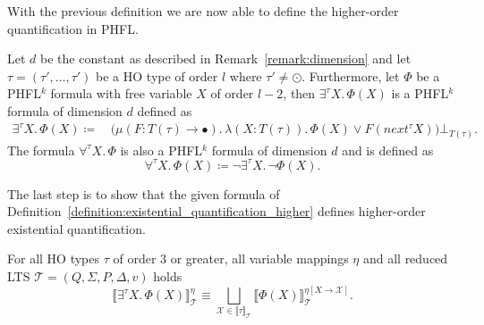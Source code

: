 With the previous definition we are now able to define the higher-order quantification in PHFL.

\begin{definition}
    \label{definition:existential_quantification_higher}
    Let $d$ be the constant as described in Remark~\ref{remark:dimension} and let $\tau = (\tau', \dots, \tau')$ be a HO type of order $l$ where $\tau' \neq \odot$. Furthermore, let
    $\Phi$ be a PHFL$^k$ formula with free variable $X$ of order $l - 2$, then $\exists^{\tau}X .\,\Phi(X)$
    is a PHFL$^k$ formula of dimension $d$ defined as
    \begin{align*}
        \exists^{\tau}X.\, \Phi(X) \coloneqq &\,\big(\mu (F \colon T(\tau) \rightarrow \bullet).\, \lambda (X \colon T(\tau)
        ).\,
        \Phi(X)
        \vee F(next^\tau X)\big)\bot_{T(\tau)}.
    \end{align*}
    The formula $\forall^{\tau}X.\,\Phi$ is also a PHFL$^k$ formula of dimension $d$ and is defined as
    \[\forall^{\tau}X.\,\Phi(X) \coloneqq \neg \exists^{\tau}X .\,\neg\Phi(X).\]
\end{definition}

The last step is to show that the given formula of Definition~\ref{definition:existential_quantification_higher} defines
higher-order existential quantification.

\begin{lemma}
    \label{lemma:existential_quantifier_higher}
    For all HO types $\tau$ of order $3$ or greater, all variable mappings $\eta$ and all reduced LTS $\mathcal{T} = (Q, \Sigma, P, \Delta, v)$ holds
    \[\llbracket \exists^\tau X.\,\Phi(X)\rrbracket^\eta_\mathcal{T} \equiv \underset{\mathcal{X} \in \llbracket \tau
    \rrbracket_\mathcal{T}}{\bigsqcup} \llbracket \Phi(X) \rrbracket^{\eta[X\rightarrow \mathcal{X}]}_\mathcal{T}.\]
\end{lemma}

